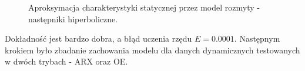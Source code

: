 \begin{figure}[h!]
\hfill
{}
\caption{Aproksymacja charakterystyki statycznej przez model rozmyty - następniki hiperboliczne.}
\end{figure}

Dokładność jest bardzo dobra, a błąd uczenia rzędu $E = \num{0.0001}$. Następnym krokiem było zbadanie zachowania modelu dla danych dynamicznych testowanych w dwóch trybach - ARX oraz OE.


